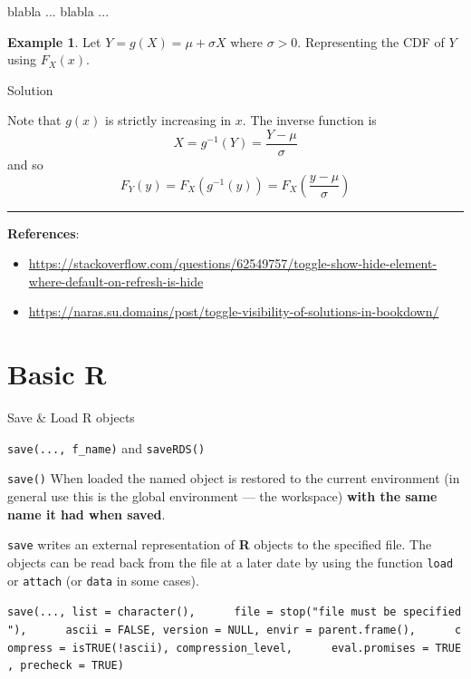 \documentclass[
]{book}
\newenvironment{Shaded}{\begin{snugshade}}{\end{snugshade}}
\newcommand{\NormalTok}[1]{#1}
\providecommand{\tightlist}{%
  \setlength{\itemsep}{0pt}\setlength{\parskip}{0pt}}
\theoremstyle{definition}
\theoremstyle{definition}
\newtheorem{example}{Example}[chapter]
\theoremstyle{definition}
\theoremstyle{definition}
\theoremstyle{remark}
\begin{document}
\begin{Shaded}
\begin{Highlighting}[]
\NormalTok{blabla ...}
\NormalTok{blabla ...}
\end{Highlighting}
\end{Shaded}

\begin{example}
\protect\hypertarget{exm:ex1}{}\label{exm:ex1}Let \(Y=g(X)=\mu+\sigma X\) where \(\sigma>0\). Representing the CDF of \(Y\) using \(F_X(x)\).
\end{example}

Solution

\label{myDIV}
Note that \(g(x)\) is strictly increasing in \(x\).
The inverse function is
\[
X = g^{-1}(Y) = \frac{Y-\mu}{\sigma}
\]
and so
\[
F_Y(y) = F_X\left(g^{-1}(y)\right) = F_X\left(\frac{y-\mu}{\sigma}\right)
\]

\begin{center}\rule{0.5\linewidth}{0.5pt}\end{center}

\textbf{References}:

\begin{itemize}
\tightlist
\item
  \url{https://stackoverflow.com/questions/62549757/toggle-show-hide-element-where-default-on-refresh-is-hide}
\item
  \url{https://naras.su.domains/post/toggle-visibility-of-solutions-in-bookdown/}
\end{itemize}

\chapter{Basic R}\label{basic-r}

Save \& Load R objects

\texttt{save(...,\ f\_name)} and \texttt{saveRDS()}

\texttt{save()} When loaded the named object is restored to the current environment (in general use this is the global environment --- the workspace) \textbf{with the same name it had when saved}.

\texttt{save} writes an external representation of \textbf{R} objects to the specified file. The objects can be read back from the file at a later date by using the function \texttt{load} or \texttt{attach} (or \texttt{data} in some cases).

\texttt{save(...,\ list\ =\ character(),\ \ \ \ \ \ file\ =\ stop("\textquotesingle{}file\textquotesingle{}\ must\ be\ specified"),\ \ \ \ \ \ ascii\ =\ FALSE,\ version\ =\ NULL,\ envir\ =\ parent.frame(),\ \ \ \ \ \ compress\ =\ isTRUE(!ascii),\ compression\_level,\ \ \ \ \ \ eval.promises\ =\ TRUE,\ precheck\ =\ TRUE)}
\end{document}
